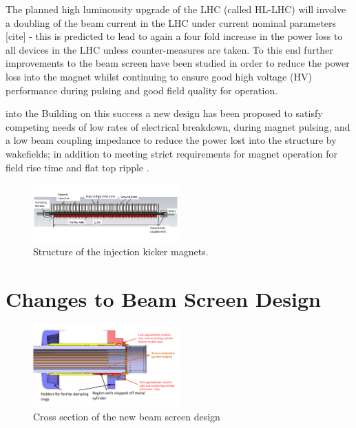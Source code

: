 \documentclass[a4paper,
              ]{jacow}
\begin{document}
The planned high luminousity upgrade of the LHC (called HL-LHC) will involve a doubling of the beam current in the LHC under current nominal parameters [cite] - this is predicted to lead to again a four fold increase in the power loss to all devices in the LHC unless counter-measures are taken. To this end further improvements to the beam screen have been studied in order to reduce the power loss into the magnet whilst continuing to ensure good high voltage (HV) performance during pulsing and good field quality for operation.


into the   \cite{mki-heatingTemp}
Building on this success a new design has been proposed to satisfy competing needs of low rates of electrical breakdown, during magnet pulsing, and a low beam coupling impedance to reduce the power lost into the structure by wakefields; in addition to meeting strict requirements for magnet operation for field rise time and flat top ripple \cite{mkiUpgrade}. 

\begin{figure}
\includegraphics[width=0.5\textwidth]{MKICrossSectionYZ.pdf}
\caption{Structure of the injection kicker magnets.}
\label{fig:mkiStruct}
\end{figure}

\section{Changes to Beam Screen Design}



\begin{figure}
\begin{center}
\includegraphics[width=0.5\textwidth]{beamScreenCrossSectionLabelled.pdf}
\caption{Cross section of the new beam screen design}
\label{fig:beamScreenCross}
\end{center}
\end{figure}
\end{document}
